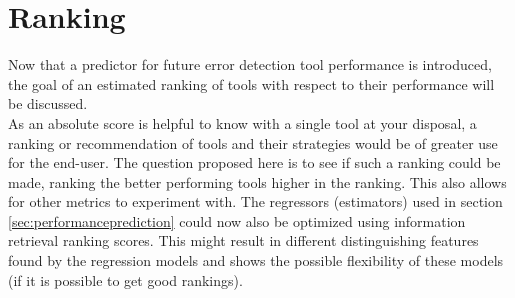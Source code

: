 \section{Ranking}
\label{sec:toolranking}
% 

Now that a predictor for future error detection tool performance is introduced, the goal of an estimated ranking of tools with respect to their performance will be discussed.
~\\As an absolute score is helpful to know with a single tool at your disposal, a ranking or recommendation of tools and their strategies would be of greater use for the end-user. The question proposed here is to see if such a ranking could be made, ranking the better performing tools higher in the ranking. This also allows for other metrics to experiment with. The regressors (estimators) used in section \ref{sec:performanceprediction} could now also be optimized using information retrieval ranking scores. This might result in different distinguishing features found by the regression models and shows the possible flexibility of these models (if it is possible to get good rankings).

